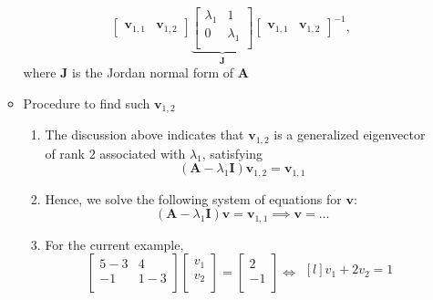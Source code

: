 \documentclass[12pt,a4paper]{article}
\begin{document}
\begin{itemize}
\begin{itemize}
\begin{equation}
\begin{bmatrix}
        \bm{v}_{1,1} & \bm{v}_{1,2}
      \end{bmatrix}
      \underbrace{
      \begin{bmatrix}
        \lambda_{1} & 1 \\
        0 & \lambda_{1} \\
      \end{bmatrix}}_{\bm{J}}
      \begin{bmatrix}
        \bm{v}_{1,1} & \bm{v}_{1,2}
      \end{bmatrix}^{-1},
    \end{equation}
    where $\bm{J}$ is the Jordan normal form of $\bm{A}$
  \item Procedure to find such $\bm{v}_{1,2}$
    \begin{enumerate}
    \item The discussion above indicates that
      $\bm{v}_{1,2}$ is a generalized eigenvector of rank $2$ associated with $\lambda_{1}$, satisfying
      \begin{equation}\nonumber%
        (\bm{A} - \lambda_{1}\bm{I})\bm{v}_{1,2} = \bm{v}_{1,1}
      \end{equation}
    \item Hence, we solve the following system of equations for $\bm{v}$:
      \begin{equation}\nonumber%
        (\bm{A} - \lambda_{1}\bm{I})\bm{v} = \bm{v}_{1,1}
        \implies
        \bm{v} = \ldots
      \end{equation}
    \item For the current example,
      \begin{equation}\nonumber%
        \begin{bmatrix}
          5 - 3 & 4 \\
          -1 & 1 - 3 \\
        \end{bmatrix}
        \begin{bmatrix}
          v_{1} \\
          v_{2} \\
        \end{bmatrix}
        = 
        \begin{bmatrix}
          2 \\
          -1 \\
        \end{bmatrix}
        \iff
        \begin{matrix*}[l]
          v_{1} + 2v_{2} = 1  \\

\end{matrix*}
\end{equation}
\end{enumerate}
\end{itemize}
\end{itemize}
\end{document}
